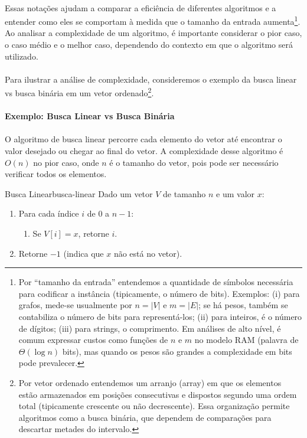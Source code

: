 \documentclass[12pt,a4paper]{article}
\begin{document}
\paragraph{}
Essas notações ajudam a comparar a eficiência de diferentes algoritmos e a entender como eles se comportam à medida que o tamanho da entrada aumenta\footnote{Por “tamanho da entrada” entendemos a quantidade de símbolos necessária para codificar a instância (tipicamente, o número de bits). Exemplos: (i) para grafos, mede-se usualmente por \(n=|V|\) e \(m=|E|\); se há pesos, também se contabiliza o número de bits para representá-los; (ii) para inteiros, é o número de dígitos; (iii) para strings, o comprimento. Em análises de alto nível, é comum expressar custos como funções de \(n\) e \(m\) no modelo RAM (palavra de \(\Theta(\log n)\) bits), mas quando os pesos são grandes a complexidade em bits pode prevalecer.}. Ao analisar a complexidade de um algoritmo, é importante considerar o pior caso, o caso médio e o melhor caso, dependendo do contexto em que o algoritmo será utilizado.

\paragraph{}
Para ilustrar a análise de complexidade, consideremos o exemplo da busca linear vs busca binária em um vetor ordenado\footnote{Por vetor ordenado entendemos um arranjo (array) em que os elementos estão armazenados em posições consecutivas e dispostos segundo uma ordem total (tipicamente crescente ou não decrescente). Essa organização permite algoritmos como a busca binária, que dependem de comparações para descartar metades do intervalo.}.

\paragraph{Exemplo: Busca Linear vs Busca Binária}
\paragraph{}
O algoritmo de busca linear percorre cada elemento do vetor até encontrar o valor desejado ou chegar ao final do vetor. A complexidade desse algoritmo é \(O(n)\) no pior caso, onde \(n\) é o tamanho do vetor, pois pode ser necessário verificar todos os elementos.

\begin{algobox}{Busca Linear}{busca-linear}
    Dado um vetor \(V\) de tamanho \(n\) e um valor \(x\):
    \begin{enumerate}\setlength{\itemsep}{2pt}
        \item Para cada índice \(i\) de \(0\) a \(n - 1\):
              \begin{enumerate}\setlength{\itemsep}{2pt}
                  \item Se \(V[i] = x\), retorne \(i\).
              \end{enumerate}
        \item Retorne \(-1\) (indica que \(x\) não está no vetor).
    \end{enumerate}
\end{algobox}
\end{document}
